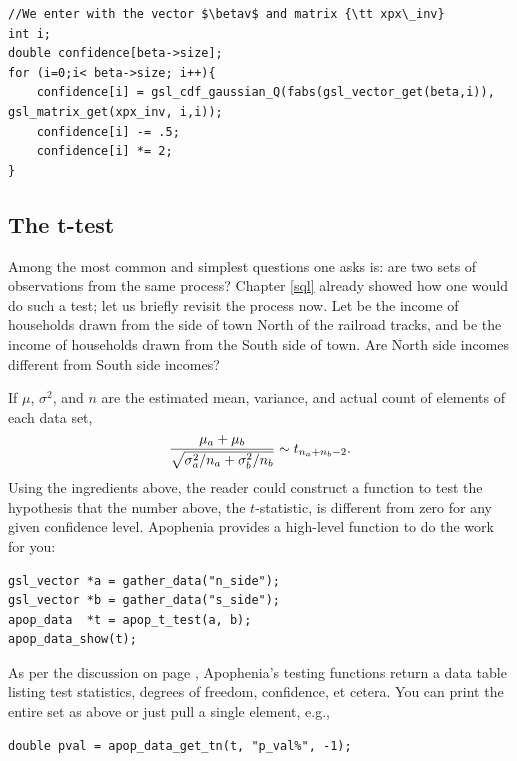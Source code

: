 \lstset{texcl=true}
\begin{lstlisting}
//We enter with the vector $\betav$ and matrix {\tt xpx\_inv}
int i;
double confidence[beta->size];
for (i=0;i< beta->size; i++){
    confidence[i] = gsl_cdf_gaussian_Q(fabs(gsl_vector_get(beta,i)), gsl_matrix_get(xpx_inv, i,i));
    confidence[i] -= .5;
    confidence[i] *= 2;
}
\end{lstlisting}
\lstset{texcl=false}


\subsection{The t-test} \label{ttest} 
Among the most common and simplest questions one asks is: are two 
sets of observations from the same process? Chapter \ref{sql} already showed how one
would do such a test; let us briefly revisit the process now.
Let  be the income of households
drawn from the side of town North of the railroad tracks, and
 be the income of households drawn from the South side of
town. Are North side incomes different from South side incomes? 

If $\mu$,
$\sigma^2$, and $n$ are the estimated mean, variance, and actual count
of elements of each data set,
$${\mu_a + \mu_b \over \sqrt{\sigma^2_a/n_a + \sigma^2_b/n_b}} \sim t_{n_a + n_b -2}.$$
Using the ingredients above, the reader could construct a function to
test the hypothesis that the number above, the $t$-statistic, is
different from zero for any given confidence level. Apophenia provides a
high-level function to do the work for you:

\begin{lstlisting}
gsl_vector *a = gather_data("n_side");
gsl_vector *b = gather_data("s_side");
apop_data  *t = apop_t_test(a, b);
apop_data_show(t);
\end{lstlisting}
As per the discussion on page \pageref{testoutput}, Apophenia's testing
functions return a data table listing test statistics, degrees of
freedom, confidence, et cetera. You can print the entire set as above or
just pull a single element, e.g.,
\begin{lstlisting}
double pval = apop_data_get_tn(t, "p_val%", -1);
\end{lstlisting}

